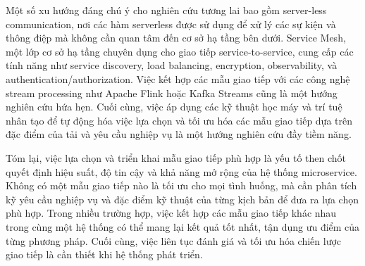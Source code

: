 Một số xu hướng đáng chú ý cho nghiên cứu tương lai bao gồm server-less communication, nơi các hàm serverless được sử dụng để xử lý các sự kiện và thông điệp mà không cần quan tâm đến cơ sở hạ tầng bên dưới. Service Mesh, một lớp cơ sở hạ tầng chuyên dụng cho giao tiếp service-to-service, cung cấp các tính năng như service discovery, load balancing, encryption, observability, và authentication/authorization. Việc kết hợp các mẫu giao tiếp với các công nghệ stream processing như Apache Flink hoặc Kafka Streams cũng là một hướng nghiên cứu hứa hẹn. Cuối cùng, việc áp dụng các kỹ thuật học máy và trí tuệ nhân tạo để tự động hóa việc lựa chọn và tối ưu hóa các mẫu giao tiếp dựa trên đặc điểm của tải và yêu cầu nghiệp vụ là một hướng nghiên cứu đầy tiềm năng.

Tóm lại, việc lựa chọn và triển khai mẫu giao tiếp phù hợp là yếu tố then chốt quyết định hiệu suất, độ tin cậy và khả năng mở rộng của hệ thống microservice. Không có một mẫu giao tiếp nào là tối ưu cho mọi tình huống, mà cần phân tích kỹ yêu cầu nghiệp vụ và đặc điểm kỹ thuật của từng kịch bản để đưa ra lựa chọn phù hợp. Trong nhiều trường hợp, việc kết hợp các mẫu giao tiếp khác nhau trong cùng một hệ thống có thể mang lại kết quả tốt nhất, tận dụng ưu điểm của từng phương pháp. Cuối cùng, việc liên tục đánh giá và tối ưu hóa chiến lược giao tiếp là cần thiết khi hệ thống phát triển.